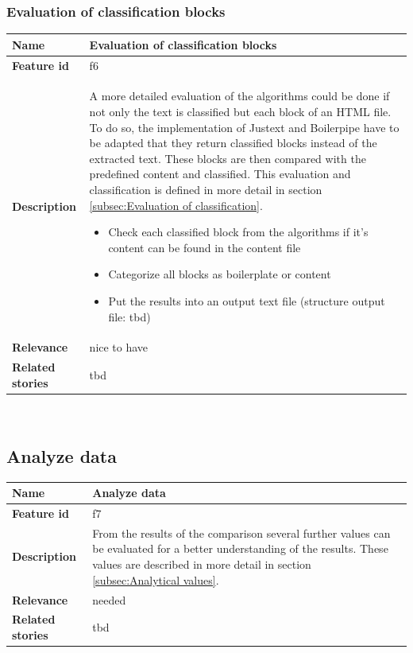 \subsubsection{Evaluation of classification blocks}
\label{subsec:Evaluation of classification blocks}

	\begin{tabular}{ | p{3cm} | p{12cm} |}
	\hline
	\textbf{Name} 				& Evaluation of classification blocks \\ \hline
	\textbf{Feature id} 		& f6 \\ \hline
	\textbf{Description} 		& A more detailed evaluation of the algorithms could be done if not only the text is classified but each block of an HTML file. To do so, the implementation of Justext and Boilerpipe have to be adapted that they return classified blocks instead of the extracted text. These blocks are then compared with the predefined content and classified. This evaluation and classification is defined in more detail in section \ref{subsec:Evaluation of classification}.
								\begin{itemize}
							        \item Check each classified block from the algorithms if it's content can be found in the content file
							        \item Categorize all blocks as boilerplate or content
							        \item Put the results into an output text file (structure output file: tbd)
						        \end{itemize} \\ \hline
	\textbf{Relevance} 			& nice to have\\ \hline
	\textbf{Related stories} 	& tbd \\ \hline
	\end{tabular} \\





\subsection{Analyze data}
\label{subsec:Analyze data}

	\begin{tabular}{ | p{3cm} | p{12cm} |}
	\hline
	\textbf{Name} 				& Analyze data \\ \hline
	\textbf{Feature id} 		& f7 \\ \hline
	\textbf{Description} 		&  From the results of the comparison several further values can be evaluated for a better understanding of the results. These values are described in more detail in section \ref{subsec:Analytical values}.
								    \\ \hline
	\textbf{Relevance} 			& needed \\ \hline
	\textbf{Related stories} 	& tbd \\ \hline
	\end{tabular} \\

